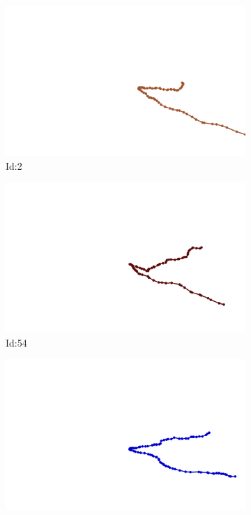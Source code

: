 \documentclass[12pt,twoside]{report}
\begin{document}
\begin{figure}
\centering
\begin{subfigure}[b]{0.20\textwidth}
\centering
\includegraphics[width=\textwidth]{../../trajectories/2.png}
\caption{Id:2}
\end{subfigure}
\begin{subfigure}[b]{0.20\textwidth}
\centering
\includegraphics[width=\textwidth]{../../trajectories/54.png}
\caption{Id:54}
\end{subfigure}
\begin{subfigure}[b]{0.20\textwidth}
\centering
\includegraphics[width=\textwidth]{../../trajectories/158.png}

\end{subfigure}
\end{figure}
\end{document}
